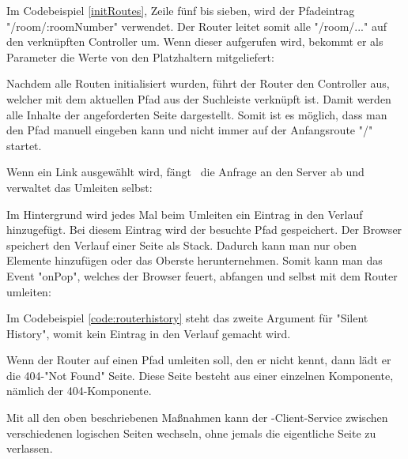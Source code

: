 Im Codebeispiel \ref{initRoutes}, Zeile fünf bis sieben, wird der Pfadeintrag "{\ttfamily /room/:roomNumber}" verwendet. Der Router leitet somit alle "{\ttfamily /room/...}" auf den verknüpften Controller um. Wenn dieser aufgerufen wird, bekommt er als Parameter die Werte von den Platzhaltern mitgeliefert:


Nachdem alle Routen initialisiert wurden, führt der Router den Controller aus, welcher mit dem aktuellen Pfad aus der Suchleiste verknüpft ist. Damit werden alle  Inhalte der angeforderten Seite dargestellt. Somit ist es möglich, dass man den Pfad manuell eingeben kann und nicht immer auf der Anfangsroute "{\ttfamily /}" startet.

Wenn ein Link ausgewählt wird, fängt \ZELIA\ die Anfrage an den Server ab und verwaltet das Umleiten selbst:


Im  Hintergrund wird jedes Mal beim Umleiten ein Eintrag in den Verlauf hinzugefügt. Bei diesem Eintrag wird der besuchte Pfad gespeichert. Der Browser speichert den Verlauf einer Seite als Stack. Dadurch kann man nur oben Elemente hinzufügen oder das Oberste herunternehmen. Somit kann man das Event "onPop", welches der Browser feuert, abfangen und selbst mit dem Router umleiten:


Im Codebeispiel \ref{code:routerhistory} steht das zweite Argument für "Silent History", womit kein Eintrag in den Verlauf gemacht wird.

Wenn der Router auf einen Pfad umleiten soll, den er nicht kennt, dann lädt er die 404-"Not Found" Seite. Diese Seite besteht aus einer einzelnen Komponente, nämlich der 404-Komponente.


Mit all den oben beschriebenen Maßnahmen kann der \ZELIA-Client-Service zwischen verschiedenen logischen Seiten wechseln, ohne jemals die eigentliche Seite zu verlassen.

